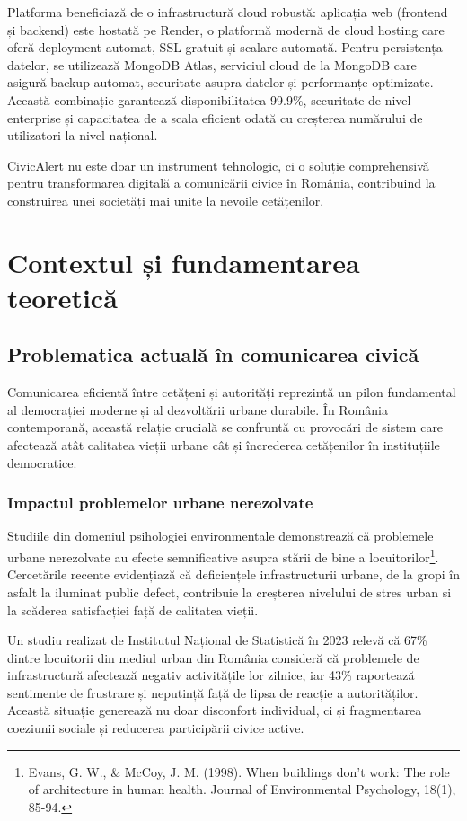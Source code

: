 \documentclass[12pt,a4paper]{report}
\begin{document}
Platforma beneficiază de o infrastructură cloud robustă: aplicația web (frontend și backend) este hostată pe Render, o platformă modernă de cloud hosting care oferă deployment automat, SSL gratuit și scalare automată. Pentru persistența datelor, se utilizează MongoDB Atlas, serviciul cloud de la MongoDB care asigură backup automat, securitate asupra datelor și performanțe optimizate. Această combinație garantează disponibilitatea 99.9\%, securitate de nivel enterprise și capacitatea de a scala eficient odată cu creșterea numărului de utilizatori la nivel național.

CivicAlert nu este doar un instrument tehnologic, ci o soluție comprehensivă pentru transformarea digitală a comunicării civice în România, contribuind la construirea unei societăți mai unite la nevoile cetățenilor.


\newpage
\chapter{Contextul și fundamentarea teoretică}

\section{Problematica actuală în comunicarea civică}

Comunicarea eficientă între cetățeni și autorități reprezintă un pilon fundamental al democrației moderne și al dezvoltării urbane durabile. În România contemporană, această relație crucială se confruntă cu provocări de sistem care afectează atât calitatea vieții urbane cât și încrederea cetățenilor în instituțiile democratice.
\subsection{Impactul problemelor urbane nerezolvate}

Studiile din domeniul psihologiei environmentale demonstrează că problemele urbane nerezolvate au efecte semnificative asupra stării de bine a locuitorilor\footnote{Evans, G. W., \& McCoy, J. M. (1998). When buildings don't work: The role of architecture in human health. Journal of Environmental Psychology, 18(1), 85-94.}. Cercetările recente evidențiază că deficiențele infrastructurii urbane, de la gropi în asfalt la iluminat public defect, contribuie la creșterea nivelului de stres urban și la scăderea satisfacției față de calitatea vieții.

Un studiu realizat de Institutul Național de Statistică în 2023 relevă că 67\% dintre locuitorii din mediul urban din România consideră că problemele de infrastructură afectează negativ activitățile lor zilnice, iar 43\% raportează sentimente de frustrare și neputință față de lipsa de reacție a autorităților. Această situație generează nu doar disconfort individual, ci și fragmentarea coeziunii sociale și reducerea participării civice active.
\end{document}
